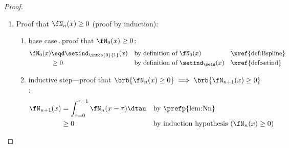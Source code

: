 \begin{proof}
\begin{enumerate}
  \item Proof that $\fN_n(x) \ge 0$ (proof by induction): \label{item:bspline_Nprop_ge0}
    \begin{enumerate}
      \item base case\ldots proof that $\fN_0(x)\ge0$:
        \begin{align*}
          \fN_0(x)
            &\eqd \setind_\intco{0}{1}(x) 
            &&    \text{by definition of $\fN_0(x)$}         &&\text{\xref{def:Bspline}}
          \\&\ge  0
            &&    \text{by definition of $\setind_\setA(x)$} &&\text{\xref{def:setind}}
        \end{align*}

      \item inductive step---proof that $\brb{\fN_n(x)\ge0}\implies\brb{\fN_{n+1}(x)\ge0}$:
        \begin{align*}
          \fN_{n+1}(x)
            &= \int_{\tau=0}^{\tau=1} \fN_n(x-\tau) \dtau
            && \text{by \prefp{lem:Nn}}
          \\&\ge 0
            && \text{by induction hypothesis ($\fN_n(x)\ge0$)}
        \end{align*}
    \end{enumerate}


\end{enumerate}
\end{proof}
